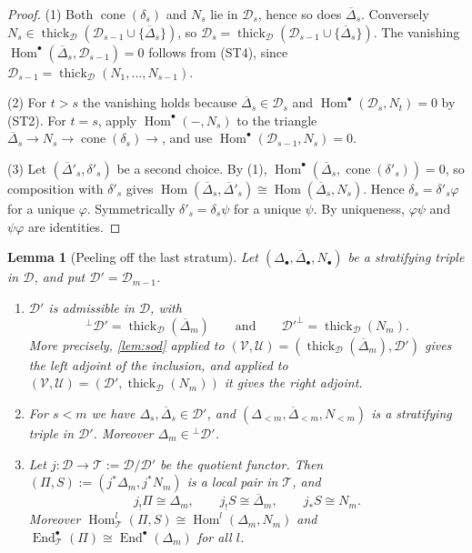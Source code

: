 \documentclass[11pt,reqno]{amsart}
\theoremstyle{plain}
\newtheorem{lemma}[theorem]{Lemma}
\theoremstyle{definition}
\theoremstyle{remark}
\DeclareMathOperator{\Hom}{Hom}
\DeclareMathOperator{\End}{End}
\DeclareMathOperator{\cone}{cone}
\newcommand{\thick}[2][\cD]{\operatorname{thick}_{#1}(#2)}
\newcommand{\Deltabar}{\overline{\Delta}}
\newcommand{\cD}{\mathcal{D}}
\newcommand{\cT}{\mathcal{T}}
\newcommand{\cU}{\mathcal{U}}
\newcommand{\cV}{\mathcal{V}}
\begin{document}
\begin{proof}
(1) Both $\cone(\delta_s)$ and $N_s$ lie in $\cD_s$, hence so does $\Deltabar_s$. Conversely $N_s\in\thick{\cD_{s-1}\cup\{\Deltabar_s\}}$, so $\cD_s=\thick{\cD_{s-1}\cup\{\Deltabar_s\}}$. The vanishing $\Hom^\bullet(\Deltabar_s,\cD_{s-1})=0$ follows from (ST4), since $\cD_{s-1}=\thick{N_1,\dots,N_{s-1}}$.

(2) For $t>s$ the vanishing holds because $\Deltabar_s\in\cD_s$ and $\Hom^\bullet(\cD_s,N_t)=0$ by (ST2). For $t=s$, apply $\Hom^\bullet(-,N_s)$ to the triangle $\Deltabar_s\to N_s\to\cone(\delta_s)\to$, and use $\Hom^\bullet(\cD_{s-1},N_s)=0$.

(3) Let $(\Deltabar'_s,\delta'_s)$ be a second choice. By (1), $\Hom^\bullet(\Deltabar_s,\cone(\delta'_s))=0$, so composition with $\delta'_s$ gives $\Hom(\Deltabar_s,\Deltabar'_s)\cong\Hom(\Deltabar_s,N_s)$. Hence $\delta_s=\delta'_s\varphi$ for a unique $\varphi$. Symmetrically $\delta'_s=\delta_s\psi$ for a unique $\psi$. By uniqueness, $\varphi\psi$ and $\psi\varphi$ are identities.
\end{proof}

\begin{lemma}[Peeling off the last stratum]\label{lem:peel}
Let $(\Delta_\bullet,\Deltabar_\bullet,N_\bullet)$ be a stratifying triple in $\cD$, and put $\cD'=\cD_{m-1}$.
\begin{enumerate}
\item $\cD'$ is admissible in $\cD$, with
\[{}^\perp\cD'=\thick{\Deltabar_m}\qquad\text{and}\qquad\cD'^\perp=\thick{N_m}.\]
More precisely, \cref{lem:sod} applied to $(\cV,\cU)=(\thick{\Deltabar_m},\cD')$ gives the left adjoint of the inclusion, and applied to $(\cV,\cU)=(\cD',\thick{N_m})$ it gives the right adjoint.
\item For $s<m$ we have $\Delta_s,\Deltabar_s\in\cD'$, and $(\Delta_{<m},\Deltabar_{<m},N_{<m})$ is a stratifying triple in $\cD'$. Moreover $\Delta_m\in{}^\perp\cD'$.
\item Let $j\colon\cD\to\cT:=\cD/\cD'$ be the quotient functor. Then $(\Pi,S):=(j^*\Delta_m,j^*N_m)$ is a local pair in $\cT$, and
\[j_!\Pi\cong\Delta_m,\qquad j_!S\cong\Deltabar_m,\qquad j_*S\cong N_m.\]
Moreover $\Hom^l_\cT(\Pi,S)\cong\Hom^l(\Delta_m,N_m)$ and $\End^\bullet_\cT(\Pi)\cong\End^\bullet(\Delta_m)$ for all $l$.
\end{enumerate}
\end{lemma}
\end{document}
